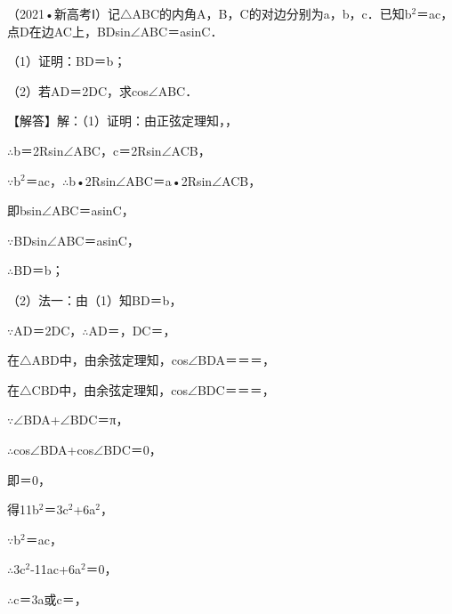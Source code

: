 \begin{question}
（2021•新高考Ⅰ）记$\triangle$ABC的内角A，B，C的对边分别为a，b，c．已知b$^{2}$＝ac，点D在边AC上，BDsin$\angle$ABC＝asinC．\par
（1）证明：BD＝b；\par
（2）若AD＝2DC，求cos$\angle$ABC．\par
\begin{solution}
【解答】解：（1）证明：由正弦定理知，\allowbreak{}，\par
$\therefore$b＝2Rsin$\angle$ABC，c＝2Rsin$\angle$ACB，\par
$\because$b$^{2}$＝ac，$\therefore$b•2Rsin$\angle$ABC＝a•2Rsin$\angle$ACB，\par
即bsin$\angle$ABC＝asinC，\par
$\because$BDsin$\angle$ABC＝asinC，\par
$\therefore$BD＝b；\par
（2）法一：由（1）知BD＝b，\par
$\because$AD＝2DC，$\therefore$AD＝\allowbreak{}，DC＝\allowbreak{}，\par
在$\triangle$ABD中，由余弦定理知，cos$\angle$BDA＝\allowbreak{}＝\allowbreak{}＝\allowbreak{}，\par
在$\triangle$CBD中，由余弦定理知，cos$\angle$BDC＝\allowbreak{}＝\allowbreak{}＝\allowbreak{}，\par
$\because$$\angle$BDA+$\angle$BDC＝π，\par
$\therefore$cos$\angle$BDA+cos$\angle$BDC＝0，\par
即\allowbreak{}＝0，\par
得11b$^{2}$＝3c$^{2}$+6a$^{2}$，\par
$\because$b$^{2}$＝ac，\par
$\therefore$3c$^{2}$-11ac+6a$^{2}$＝0，\par
$\therefore$c＝3a或c＝\allowbreak{}，\par
$$
\end{solution}
\end{question}
